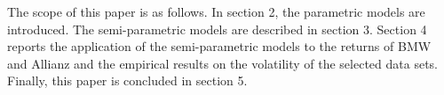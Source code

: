 The scope of this paper is as follows. In section 2, the parametric models are introduced. The semi-parametric models are described in section 3. Section 4 reports the application of the semi-parametric models to the returns of BMW and Allianz and the empirical results on the volatility of the selected data sets. Finally, this paper is concluded in section 5.